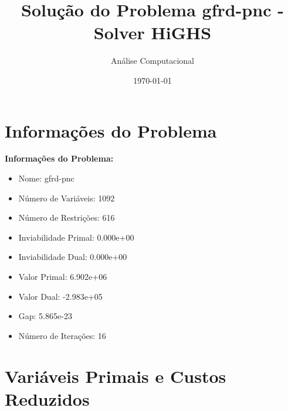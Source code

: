 \documentclass[12pt]{article}
\title{Solução do Problema gfrd-pnc - Solver HiGHS}
\author{Análise Computacional}
\date{\today}
\begin{document}
\maketitle

\section{Informações do Problema}

\textbf{Informações do Problema:}
\begin{itemize}
\item Nome: gfrd-pnc
\item Número de Variáveis: 1092
\item Número de Restrições: 616
\item Inviabilidade Primal: 0.000e+00
\item Inviabilidade Dual: 0.000e+00
\item Valor Primal: 6.902e+06
\item Valor Dual: -2.983e+05
\item Gap: 5.865e-23
\item Número de Iterações: 16
\end{itemize}


\section{Variáveis Primais e Custos Reduzidos}
\end{document}
